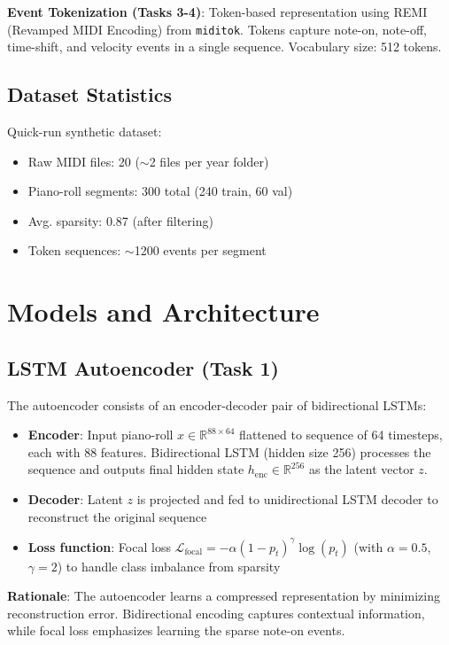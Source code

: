 \documentclass[conference]{IEEEtran}
\begin{document}
\textbf{Event Tokenization (Tasks 3-4)}: Token-based representation using REMI (Revamped MIDI Encoding) from \texttt{miditok}. Tokens capture note-on, note-off, time-shift, and velocity events in a single sequence. Vocabulary size: 512 tokens.

\subsection{Dataset Statistics}
Quick-run synthetic dataset:
\begin{itemize}
    \item Raw MIDI files: 20 ($\sim$2 files per year folder)
    \item Piano-roll segments: 300 total (240 train, 60 val)
    \item Avg. sparsity: 0.87 (after filtering)
    \item Token sequences: $\sim$1200 events per segment
\end{itemize}

\section{Models and Architecture}

\subsection{LSTM Autoencoder (Task 1)}
The autoencoder consists of an encoder-decoder pair of bidirectional LSTMs:
\begin{itemize}
    \item \textbf{Encoder}: Input piano-roll $x \in \mathbb{R}^{88 \times 64}$ flattened to sequence of 64 timesteps, each with 88 features. Bidirectional LSTM (hidden size 256) processes the sequence and outputs final hidden state $h_{\text{enc}} \in \mathbb{R}^{256}$ as the latent vector $z$.
    \item \textbf{Decoder}: Latent $z$ is projected and fed to unidirectional LSTM decoder to reconstruct the original sequence
    \item \textbf{Loss function}: Focal loss $\mathcal{L}_{\text{focal}} = -\alpha(1 - p_t)^\gamma \log(p_t)$ (with $\alpha=0.5$, $\gamma=2$) to handle class imbalance from sparsity
\end{itemize}

\textbf{Rationale}: The autoencoder learns a compressed representation by minimizing reconstruction error. Bidirectional encoding captures contextual information, while focal loss emphasizes learning the sparse note-on events.
\end{document}
